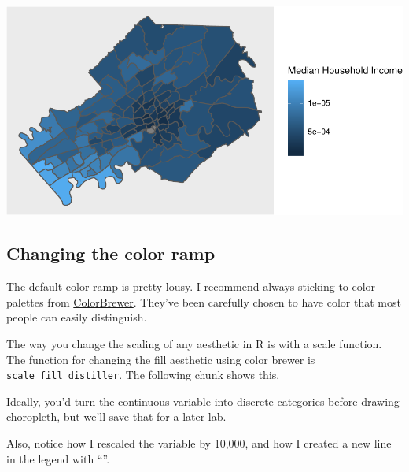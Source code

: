 \documentclass[]{article}
\newenvironment{Shaded}{\begin{snugshade}}{\end{snugshade}}
\newcommand{\CharTok}[1]{\textcolor[rgb]{0.31,0.60,0.02}{#1}}
\newcommand{\DataTypeTok}[1]{\textcolor[rgb]{0.13,0.29,0.53}{#1}}
\newcommand{\DecValTok}[1]{\textcolor[rgb]{0.00,0.00,0.81}{#1}}
\newcommand{\KeywordTok}[1]{\textcolor[rgb]{0.13,0.29,0.53}{\textbf{#1}}}
\newcommand{\NormalTok}[1]{#1}
\newcommand{\OperatorTok}[1]{\textcolor[rgb]{0.81,0.36,0.00}{\textbf{#1}}}
\newcommand{\OtherTok}[1]{\textcolor[rgb]{0.56,0.35,0.01}{#1}}
\newcommand{\StringTok}[1]{\textcolor[rgb]{0.31,0.60,0.02}{#1}}
\begin{document}
\includegraphics{lab02_rmarkdown_tutorial_files/figure-latex/unnamed-chunk-4-1.pdf}

\hypertarget{changing-the-color-ramp}{%
\subsection{Changing the color ramp}\label{changing-the-color-ramp}}

The default color ramp is pretty lousy. I recommend always sticking to
color palettes from
\href{http://colorbrewer2.org/\#type=sequential\&scheme=Blues\&n=3}{ColorBrewer}.
They've been carefully chosen to have color that most people can easily
distinguish.

The way you change the scaling of any aesthetic in R is with a scale
function. The function for changing the fill aesthetic using color
brewer is \texttt{scale\_fill\_distiller}. The following chunk shows
this.

Ideally, you'd turn the continuous variable into discrete categories
before drawing choropleth, but we'll save that for a later lab.

Also, notice how I rescaled the variable by 10,000, and how I created a
new line in the legend with ``\n''.

\begin{Shaded}
\end{Shaded}
\end{document}
